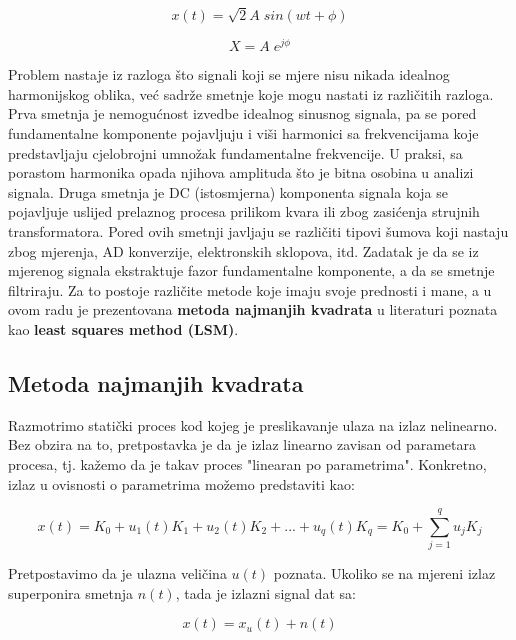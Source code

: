 \begin{equation}
    x(t) = \sqrt{2}A \; sin(wt+\phi)
    \label{eq:11}
\end{equation}

\begin{equation}
    X = A \; e^{j\phi}
    \label{eq:12}
\end{equation}

Problem nastaje iz razloga što signali koji se mjere nisu nikada idealnog harmonijskog oblika, već sadrže smetnje koje mogu nastati iz različitih razloga. Prva smetnja je nemogućnost izvedbe idealnog sinusnog signala, pa se pored fundamentalne komponente pojavljuju i viši harmonici sa frekvencijama koje predstavljaju cjelobrojni umnožak fundamentalne frekvencije. U praksi, sa porastom harmonika opada njihova amplituda što je bitna osobina u analizi signala. Druga smetnja je DC (istosmjerna) komponenta signala koja se pojavljuje uslijed prelaznog procesa prilikom kvara ili zbog zasićenja strujnih transformatora. Pored ovih smetnji javljaju se različiti tipovi šumova koji nastaju zbog mjerenja, AD konverzije, elektronskih sklopova, itd. Zadatak je da se iz mjerenog signala ekstraktuje fazor fundamentalne komponente, a da se smetnje filtriraju. Za to postoje različite metode koje imaju svoje prednosti i mane, a u ovom radu je prezentovana \textbf{metoda najmanjih kvadrata} u literaturi poznata kao \textbf{least squares method (LSM)}.  

\subsection{Metoda najmanjih kvadrata}

Razmotrimo statički proces kod kojeg je preslikavanje ulaza na izlaz nelinearno. Bez obzira na to, pretpostavka je da je izlaz linearno zavisan od parametara procesa, tj. kažemo da je takav proces "linearan po parametrima". Konkretno, izlaz u ovisnosti o parametrima možemo predstaviti kao:


\begin{equation}
    x(t)=K_0+u_1(t)K_1+u_2(t)K_2+...+u_q(t)K_q=K_0+\sum_{j=1}^{q} u_jK_j
\end{equation}

Pretpostavimo da je ulazna veličina $u(t)$ poznata. Ukoliko se na mjereni izlaz superponira smetnja $n(t)$, tada je izlazni signal dat sa:

\begin{equation}
    x(t)=x_u(t)+n(t)
\end{equation}

